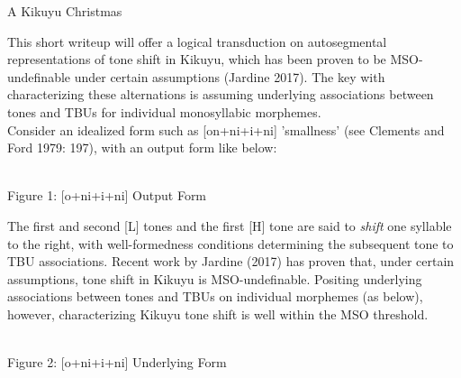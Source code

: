 \documentclass{article}
\begin{document}
\begin{center}
\Large{A Kikuyu Christmas}
\end{center} 
\vspace{.5cm} 
\par \indent
This short writeup will offer a logical transduction on autosegmental representations of tone shift in Kikuyu, which has been proven to be MSO-undefinable under certain assumptions (Jardine 2017). The key with characterizing these alternations is assuming underlying associations between tones and TBUs for individual monosyllabic morphemes.\\
\indent
Consider an idealized form such as [on+ni+i+ni] 'smallness' (see Clements and Ford 1979: 197), with an output form like below:\\
\begin{center}
\\
\smallskip{}
Figure 1: [o+ni+i+ni] Output Form
\end{center}
The first and second [L] tones and the first [H] tone are said to \textit{shift} one syllable to the right, with well-formedness conditions determining the subsequent tone to TBU associations. Recent work by Jardine (2017) has proven that, under certain assumptions, tone shift in Kikuyu is MSO-undefinable. Positing underlying associations between tones and TBUs on individual morphemes (as below), however, characterizing Kikuyu tone shift is well within the MSO threshold.\\
\begin{center}
\\
\smallskip{}
Figure 2: [o+ni+i+ni] Underlying Form
\end{center}
\end{document}
